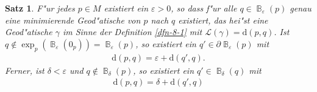 \documentclass[paper=A4, twoside, chapterprefix=true, bibliography=totoc, headsepline]{scrbook}
\let\temp\phi{}
\let\phi\varphi{}
\let\varphi\temp{}
\let\temp\theta{}
\let\theta\vartheta{}
\let\vartheta\temp{}
\let\temp\epsilon{}
\let\epsilon\varepsilon{}
\let\varepsilon\temp{}
\let\temp\rho{}
\let\rho\varrho{}
\let\varrho\temp{}
\DeclareMathOperator{\B}{\mathbb{B}} %
\newcommand{\dop}{\mathrm{d}}
\theoremstyle{plain}
\newtheorem{Satz}[Dfn]{Satz}
\theoremstyle{nonumberplain}
\theoremstyle{empty}
\theoremstyle{break}
\begin{document}
\begin{Satz}\label{satz-8-7}
  F"ur jedes $p \in M$ existiert ein $\epsilon > 0$, so dass f"ur alle $q \in \B_{\epsilon}(p)$ genau eine minimierende Geod"atische von $p$ nach $q$ existiert, das hei"st eine Geod"atische $\gamma$ im Sinne der Definition \ref{dfn-8-1} mit $\mathcal L(\gamma) = \dop(p,q)$.
  Ist $q \notin \exp_p(\B_{\epsilon}(0_p)) = \B_{\epsilon}(p)$, so existiert ein $q' \in \partial \B_{\epsilon}(p)$ mit
  \begin{align*}
    \dop(p,q) = \epsilon + \dop(q',q).
  \end{align*}
  Ferner, ist $\delta < \epsilon$ und $q \notin \B_\delta(p)$, so existiert ein $q' \in \B_\delta(q)$ mit
  \begin{align*}
    \dop(p,q) = \delta + \dop(q',q)
  \end{align*}
  \begin{center}\end{center}
\end{Satz}
\end{document}
